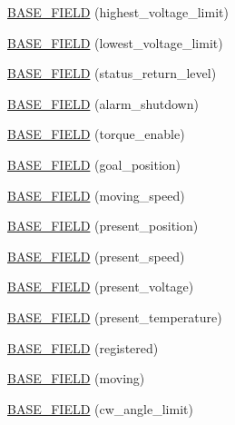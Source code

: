 \begin{DoxyCompactItemize}
\item 
\hyperlink{classdynamixel_1_1servos_1_1_base_servo_a012af5ca86e8020bf3bd95f2abed4bcd}{B\+A\+S\+E\+\_\+\+F\+I\+E\+LD} (highest\+\_\+voltage\+\_\+limit)
\item 
\hyperlink{classdynamixel_1_1servos_1_1_base_servo_ade5dee7e7e3029b7a9779b726f763112}{B\+A\+S\+E\+\_\+\+F\+I\+E\+LD} (lowest\+\_\+voltage\+\_\+limit)
\item 
\hyperlink{classdynamixel_1_1servos_1_1_base_servo_a1133c7f435ceb0d82542f609034c7b6a}{B\+A\+S\+E\+\_\+\+F\+I\+E\+LD} (status\+\_\+return\+\_\+level)
\item 
\hyperlink{classdynamixel_1_1servos_1_1_base_servo_a9b009f5190906b3851daf59d55b7cb8b}{B\+A\+S\+E\+\_\+\+F\+I\+E\+LD} (alarm\+\_\+shutdown)
\item 
\hyperlink{classdynamixel_1_1servos_1_1_base_servo_aa7c4e55ffcd9f798807d7192df7c9a11}{B\+A\+S\+E\+\_\+\+F\+I\+E\+LD} (torque\+\_\+enable)
\item 
\hyperlink{classdynamixel_1_1servos_1_1_base_servo_afa45f82edf10091dccc4cacf8731f466}{B\+A\+S\+E\+\_\+\+F\+I\+E\+LD} (goal\+\_\+position)
\item 
\hyperlink{classdynamixel_1_1servos_1_1_base_servo_a3319c8cbd3faf82f56f4b3d24a88007d}{B\+A\+S\+E\+\_\+\+F\+I\+E\+LD} (moving\+\_\+speed)
\item 
\hyperlink{classdynamixel_1_1servos_1_1_base_servo_a33900c9ece00c4a137d60a2084cdb05e}{B\+A\+S\+E\+\_\+\+F\+I\+E\+LD} (present\+\_\+position)
\item 
\hyperlink{classdynamixel_1_1servos_1_1_base_servo_a84ddc664e4dbd299a218d06f7cd77201}{B\+A\+S\+E\+\_\+\+F\+I\+E\+LD} (present\+\_\+speed)
\item 
\hyperlink{classdynamixel_1_1servos_1_1_base_servo_ab5167c0a8fec3502cac03b94d2724647}{B\+A\+S\+E\+\_\+\+F\+I\+E\+LD} (present\+\_\+voltage)
\item 
\hyperlink{classdynamixel_1_1servos_1_1_base_servo_adebb7ca3f7e87a284b9211d1f94a0dda}{B\+A\+S\+E\+\_\+\+F\+I\+E\+LD} (present\+\_\+temperature)
\item 
\hyperlink{classdynamixel_1_1servos_1_1_base_servo_a2c06de53ab5b5e8d910da1dfd172e4f5}{B\+A\+S\+E\+\_\+\+F\+I\+E\+LD} (registered)
\item 
\hyperlink{classdynamixel_1_1servos_1_1_base_servo_a46fc43c764852d3aa1a1b839b367af7c}{B\+A\+S\+E\+\_\+\+F\+I\+E\+LD} (moving)
\item 
\hyperlink{classdynamixel_1_1servos_1_1_base_servo_ad6f5dae7112bf5ada32bfcab4bdf2249}{B\+A\+S\+E\+\_\+\+F\+I\+E\+LD} (cw\+\_\+angle\+\_\+limit)

\end{DoxyCompactItemize}
